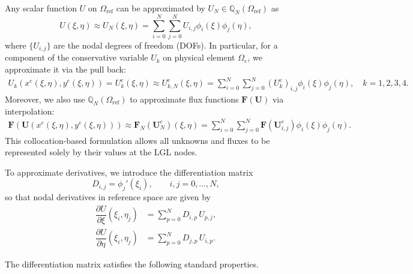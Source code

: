 \documentclass[fleqn,11pt]{amsart}
\newcommand{\omgr}{\Omega_{\mathrm{ref}}}
\newcommand{\QN}{\mathbb Q_N(\omgr)}
\begin{document}
Any scalar function $U$ on $\Omega_{\mathrm{ref}}$ can be approximated 
by $U_N\in \QN$ as
\begin{equation}
{U}(\xi,\eta)\approx U_N(\xi,\eta)=
\sum_{i=0}^N\sum_{j=0}^N U_{i,j}\phi_i(\xi)\phi_j(\eta),
\end{equation}
where $\{U_{i,j}\}$ are the nodal degrees of freedom (DOFs). 
In particular, for a component of the conservative variable $U_k$ on physical element $\Omega_e$, we approximate it via the pull back:
\begin{align}
\label{pull_back}
U_k(x^e(\xi, \eta), y^e(\xi, \eta))= {U}_k^e(\xi,\eta)
\approx {U}_{k,N}^e(\xi,\eta)=\sum_{i=0}^N\sum_{j=0}^N (U^e_k)_{i,j}\phi_i(\xi)\phi_j(\eta), \quad 
k=1,2,3,4.    
\end{align}
Moreover, we also use $\QN$ to approximate flux functions $\bm F(\bm U)$  via interpolation:
\begin{align}
    \label{flux}
\bm F(\bm U(x^e(\xi, \eta), y^e(\xi, \eta)))
\approx 
\bm F_N(\bm {U}_{N}^e)(\xi,\eta)=\sum_{i=0}^N\sum_{j=0}^N 
\bm F(\bm U_{i,j}^e)\phi_i(\xi)\phi_j(\eta).
\end{align}
This collocation-based formulation allows all unknowns and fluxes to be represented solely by their values
at the LGL nodes.

To approximate derivatives, we introduce the differentiation matrix
\begin{equation}
D_{i,j} = \phi_j'(\xi_i), \qquad i,j=0,\ldots,N,
\label{eq_D}
\end{equation}
so that nodal derivatives in reference space are given by
\begin{equation}
\begin{aligned}
\dfrac{\partial U}{\partial\xi}(\xi_i,\eta_j) &= \sum_{p=0}^N D_{i,p}\,U_{p,j},\\
\dfrac{\partial U}{\partial\eta}(\xi_i,\eta_j) &= \sum_{p=0}^N D_{j,p}\,U_{i,p}.
\end{aligned}
\label{der}
\end{equation}

The differentiation matrix satisfies the following standard properties.
\end{document}
